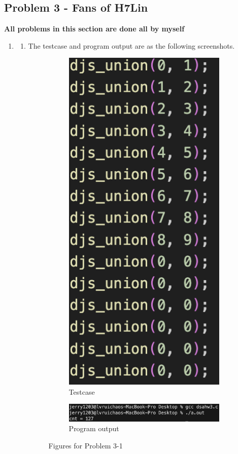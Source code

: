 \documentclass{article}
\begin{document}
\begin{CJK*}{UTF8}{bsmi}
\section{Problem 3 - Fans of H7Lin}
\textbf{All problems in this section are done all by myself}
\begin{enumerate}
    \item \begin{enumerate}
        \item  The testcase and program output are as the following screenshots. 
        \begin{figure}[H]
        \centering
    \begin{subfigure}{.5\textwidth}
      \centering
      \includegraphics[width=.3\linewidth]{1testcase.png}
      \caption{Testcase}
      \label{fig:sub1}
    \end{subfigure}%
    \begin{subfigure}{.5\textwidth}
      \centering
      \includegraphics[width=1.2\linewidth]{1result.png}
      \caption{Program output}
      \label{fig:sub2}
    \end{subfigure}
    \caption{Figures for Problem 3-1}
    \label{fig:test}
    \end{figure}
    

\end{enumerate}
\end{enumerate}
\end{CJK*}
\end{document}
